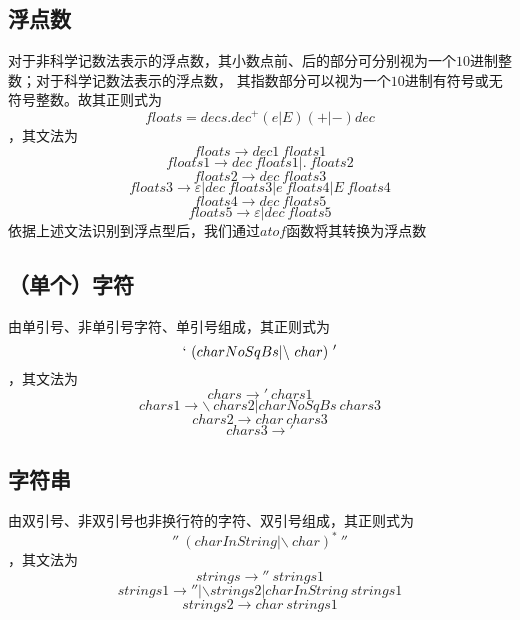 \documentclass[UTF8]{ctexart}
\begin{document}
\subsection{浮点数}
对于非科学记数法表示的浮点数，其小数点前、后的部分可分别视为一个$10$进制整数；对于科学记数法表示的浮点数，
其指数部分可以视为一个$10$进制有符号或无符号整数。故其正则式为
$$ floats = decs.{dec}^+(e|E)(+|-)dec $$
，其文法为
$$ floats \rightarrow dec1 \ floats1 $$
$$ floats1 \rightarrow dec \ floats1 | . \ floats2 $$
$$ floats2 \rightarrow dec \ floats3 $$
$$ floats3 \rightarrow \varepsilon | dec \ floats3 | e \ floats4 | E \ floats4 $$
$$ floats4 \rightarrow dec \ floats5 $$
$$ floats5 \rightarrow \varepsilon | dec \ floats5 $$
依据上述文法识别到浮点型后，我们通过$atof$函数将其转换为浮点数
\subsection{（单个）字符}
由单引号、非单引号字符、单引号组成，其正则式为
$$ ` \ (charNoSqBs | \backslash \ char) \ ' $$
，其文法为
$$ chars \rightarrow ' \ chars1 $$
$$ chars1 \rightarrow \backslash \ chars2 | charNoSqBs \ chars3 $$
$$ chars2 \rightarrow char \ chars3 $$
$$ chars3 \rightarrow ' $$
\subsection{字符串}
由双引号、非双引号也非换行符的字符、双引号组成，其正则式为
$$ '' \ {(charInString | \backslash \ char)}^* \ '' $$
，其文法为
$$ strings \rightarrow '' \ strings1 $$
$$ strings1 \rightarrow '' | \backslash strings2 | charInString \ strings1 $$
$$ strings2 \rightarrow char \ strings1 $$
\end{document}
